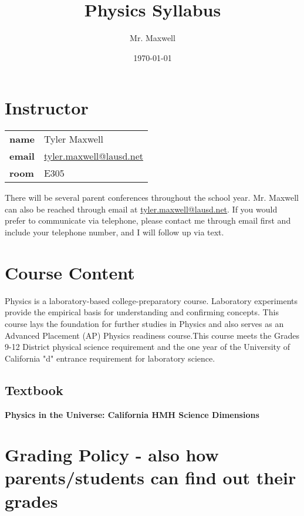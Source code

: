 \documentclass[11pt]{article}
\author{Mr. Maxwell}
\date{\today}
\title{Physics Syllabus}
\begin{document}
\maketitle
\tableofcontents


\section{Instructor}
\label{sec:org6ed2924}

\begin{center}
\begin{tabular}{ll}
\textbf{\textbf{name}} & Tyler Maxwell\\[0pt]
\textbf{\textbf{email}} & \href{mailto:tyler.maxwell@lausd.net}{tyler.maxwell@lausd.net}\\[0pt]
\textbf{\textbf{room}} & E305\\[0pt]
\end{tabular}
\end{center}

There will be several parent conferences throughout the school year. Mr. Maxwell can also be reached through email at \href{mailto:tyler.maxwell@lausd.net}{tyler.maxwell@lausd.net}. If you would prefer to communicate via telephone, please contact me through email first and include your telephone number, and I will follow up via text.

\section{Course Content}
\label{sec:org295b6dc}

Physics is a laboratory-based college-preparatory course. Laboratory experiments provide the empirical basis for understanding and confirming concepts. This course lays the foundation for further studies in Physics and also serves as an Advanced Placement (AP) Physics readiness course.This course meets the Grades 9-12 District physical science requirement and the one year of the University of California "d" entrance requirement for laboratory science.

\subsection{Textbook}
\label{sec:org03c8720}

\textbf{\textbf{Physics in the Universe: California HMH Science Dimensions}}

\section{Grading Policy - also how parents/students can find out their grades}
\label{sec:orgad993c2}
\end{document}
